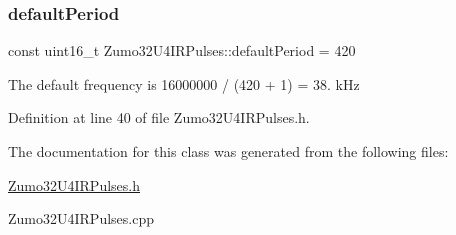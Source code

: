 \subsubsection{\texorpdfstring{default\+Period}{defaultPeriod}}
{\footnotesize\ttfamily const uint16\+\_\+t Zumo32\+U4\+I\+R\+Pulses\+::default\+Period = 420\hspace{0.3cm}{\ttfamily [static]}}

The default frequency is 16000000 / (420 + 1) = 38. k\+Hz 

Definition at line 40 of file Zumo32\+U4\+I\+R\+Pulses.\+h.



The documentation for this class was generated from the following files\+:\begin{DoxyCompactItemize}
\item 
\hyperlink{_zumo32_u4_i_r_pulses_8h}{Zumo32\+U4\+I\+R\+Pulses.\+h}\item 
Zumo32\+U4\+I\+R\+Pulses.\+cpp\end{DoxyCompactItemize}
